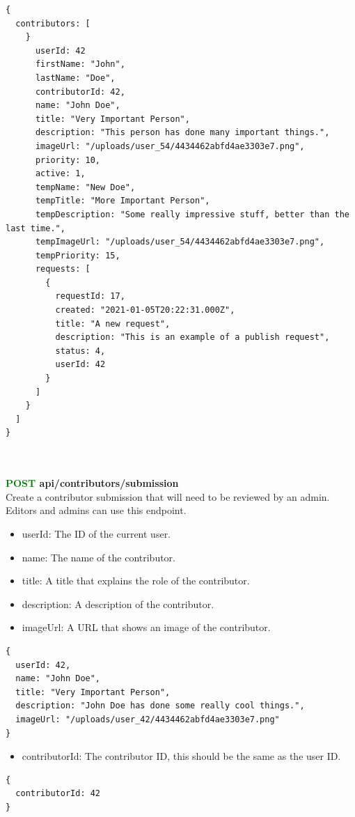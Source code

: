 \documentclass[onecolumn, draftclsnofoot,10pt, compsoc, usenames, dvipsnames]{IEEEtran}
\begin{document}
\begin{lstlisting}[caption=Example Response]
{
  contributors: [
    }
      userId: 42
      firstName: "John",
      lastName: "Doe",
      contributorId: 42,
      name: "John Doe",
      title: "Very Important Person",
      description: "This person has done many important things.",
      imageUrl: "/uploads/user_54/4434462abfd4ae3303e7.png",
      priority: 10,
      active: 1,
      tempName: "New Doe",
      tempTitle: "More Important Person",
      tempDescription: "Some really impressive stuff, better than the last time.",
      tempImageUrl: "/uploads/user_54/4434462abfd4ae3303e7.png",
      tempPriority: 15,
      requests: [
        {
          requestId: 17,
          created: "2021-01-05T20:22:31.000Z",
          title: "A new request",
          description: "This is an example of a publish request",
          status: 4,
          userId: 42
        }
      ]
    }
  ]
}
\end{lstlisting}
\\~\\


\noindent
\textbf{\textcolor{Green}{POST} api/contributors/submission} \\
Create a contributor submission that will need to be reviewed by an admin. Editors and admins can use this endpoint.
\begin{itemize}
    \item userId: The ID of the current user.
    \item name: The name of the contributor.
    \item title: A title that explains the role of the contributor.
    \item description: A description of the contributor.
    \item imageUrl: A URL that shows an image of the contributor.
\end{itemize}
\begin{lstlisting}[caption=Example Request File]
{
  userId: 42,
  name: "John Doe",
  title: "Very Important Person",
  description: "John Doe has done some really cool things.",
  imageUrl: "/uploads/user_42/4434462abfd4ae3303e7.png"
}
\end{lstlisting}
\begin{itemize}
    \item contributorId: The contributor ID, this should be the same as the user ID.
\end{itemize}
\begin{lstlisting}[caption=Example Response]
{ 
  contributorId: 42
}
\end{lstlisting}
\\~\\
\end{document}
